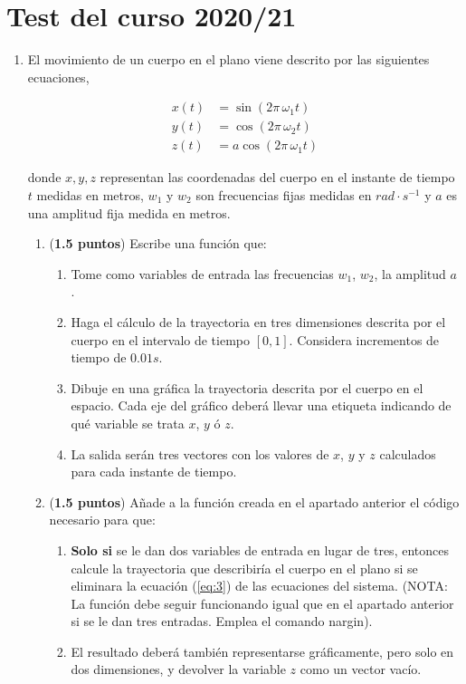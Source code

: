 \section{Test del curso 2020/21}
\begin{enumerate}

\item  El movimiento de un cuerpo en el plano viene descrito por las siguientes ecuaciones,

\begin{align}
x(t) &= \sin(2 \pi \, \omega_1 t)\\
y(t) &= \cos(2 \pi \, \omega_2 t)\\
z(t) &= a\cos(2\pi \, \omega_1 t) \label{eq:3}
\end{align}

donde $x,y,z$ representan las coordenadas del cuerpo en el instante de tiempo $t$ medidas en metros,  $w_1$ y $w_2$ son frecuencias fijas medidas en $rad\cdot s^{-1}$ y $a$ es una amplitud fija medida en metros.

\begin{enumerate}
	\item \label{ap1} (\textbf{1.5 puntos}) Escribe una función que:

\begin{enumerate}
	\item Tome como variables de entrada las frecuencias $w_1$, $w_2$, la amplitud $a$ .
	\item Haga el cálculo de la trayectoria en tres dimensiones descrita por el cuerpo en el intervalo de tiempo $[0,1]$. Considera incrementos de tiempo de $0.01s$.
	\item Dibuje en una gráfica la trayectoria descrita por el cuerpo en el espacio. Cada eje del gráfico deberá llevar  una etiqueta indicando de qué variable se trata $x$, $y$ ó $z$.
	\item La salida serán tres vectores con los valores de $x$, $y$ y $z$ calculados para cada instante de tiempo.
	\end{enumerate}

\item (\textbf{1.5 puntos}) Añade a la función creada en el apartado anterior el código necesario para que:
	\begin{enumerate}
	\item \textbf{Solo si} se le dan dos variables de entrada en lugar de tres, entonces calcule la trayectoria que describiría el cuerpo en el plano si se eliminara la ecuación (\ref{eq:3}) de las ecuaciones del sistema. (NOTA: La función debe seguir funcionando igual que en el apartado anterior si se le dan tres entradas. Emplea el comando nargin).
	\item El resultado deberá también representarse gráficamente, pero solo en dos dimensiones, y devolver la variable $z$ como un vector vacío. 
	\end{enumerate}


\end{enumerate}
\end{enumerate}
